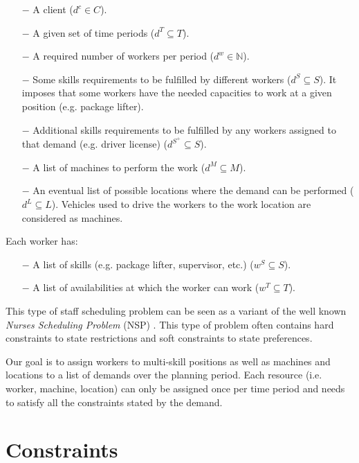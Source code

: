 \documentclass[../thesis.tex]{subfiles}
\begin{document}
\begin{itemize}
  \item[$-$] A client ($d^c \in C$).
  \item[$-$] A given set of time periods ($d^T \subseteq T$).
  \item[$-$] A required number of workers per period ($d^w \in \mathbb{N}$).
  \item[$-$] Some skills requirements to be fulfilled by different workers ($d^S \subseteq S$).
  It imposes that some workers have the needed capacities to work at a given position (e.g. package lifter).
  \item[$-$] Additional skills requirements to be fulfilled by any workers assigned to that demand (e.g. driver license) ($d^{S^{+}} \subseteq S$).
  \item[$-$] A list of machines to perform the work ($d^M \subseteq M$).
  \item[$-$] An eventual list of possible locations where the demand can be performed ($d^L \subseteq L$). 
  Vehicles used to drive the workers to the work location are considered as machines.
\end{itemize}


Each worker has:

\begin{itemize}
  \item[$-$] A list of skills (e.g. package lifter, supervisor, etc.) ($w^S \subseteq S$).
  \item[$-$] A list of availabilities at which the worker can work ($w^T \subseteq T$).  
\end{itemize}


This type of staff scheduling problem can be seen as a variant of the 
well known \emph{Nurses Scheduling Problem} (NSP) \cite{Burke2004}. 
This type of problem often contains hard constraints to state restrictions 
and soft constraints to state preferences. 




Our goal is to assign workers to multi-skill positions as well as machines and locations to a list of demands over the planning period.
Each resource (i.e. worker, machine, location) can only be assigned once per time period and needs to satisfy all the constraints stated by the demand. 

\section{Constraints}
\end{document}
